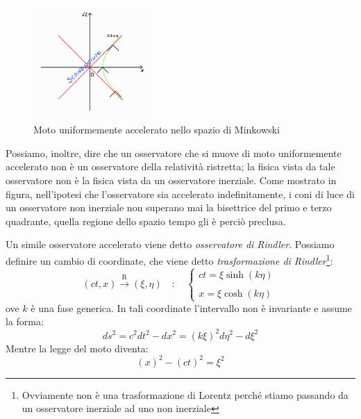 \begin{figure}[h]
    \centering
    \includegraphics[width=0.395\textwidth]{Immagini/Rindler.jpg}
    \caption{ Moto uniformemente accelerato nello spazio di Minkowski}
    \label{fig:MUA}
\end{figure}
Possiamo, inoltre, dire che un osservatore che si muove di moto uniformemente accelerato non è un osservatore della relatività ristretta; la fisica vista da tale osservatore non è la fisica vista da un osservatore inerziale. Come mostrato in figura, nell'ipotesi che l'osservatore sia accelerato indefinitamente, i coni di luce di un osservatore non inerziale non superano mai la bisettrice del primo e terzo quadrante, quella regione dello spazio tempo gli è perciò preclusa. 

Un simile osservatore accelerato viene detto \textit{osservatore di Rindler}. Possiamo definire un cambio di coordinate, che viene detto \textit{trasformazione di Rindler}\footnote{Ovviamente non è una trasformazione di Lorentz perché stiamo passando da un osservatore inerziale ad uno non inerziale}:
\begin{equation}
  (ct,x)\xrightarrow[\text{}]{\text{R}}(\xi, \eta) \quad : \quad
\begin{cases}
      ct=\xi \sinh{(k\eta)}
      \\
      \\
     x=\xi \cosh{(k\eta)}
      \end{cases}\, 
\end{equation}
ove $k$ è una fase generica. In tali coordinate l'intervallo non è invariante e assume la forma:
\begin{equation*}
    ds^2=c^2dt^2-dx^2=(k\xi)^2d\eta^2-d\xi^2  
\end{equation*}
Mentre la legge del moto diventa:
\begin{equation}
    (x)^2-(ct)^2=\xi^2
\end{equation}